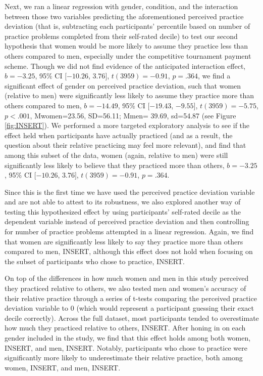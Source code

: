 \documentclass[a4paper, nobind]{templates/ociamthesis}
\begin{document}
Next, we ran a linear regression with gender, condition, and the interaction between those two variables predicting the aforementioned perceived practice deviation (that is, subtracting each participants' percentile based on number of practice problems completed from their self-rated decile) to test our second hypothesis that women would be more likely to assume they practice less than others compared to men, especially under the competitive tournament payment scheme. Though we did not find evidence of the anticipated interaction effect, \(b = -3.25\), 95\% CI \([-10.26\), \(3.76]\), \(t(3959) = -0.91\), \(p = .364\), we find a significant effect of gender on perceived practice deviation, such that women (relative to men) were significantly less likely to assume they practice more than others compared to men, \(b = -14.49\), 95\% CI \([-19.43\), \(-9.55]\), \(t(3959) = -5.75\), \(p < .001\), Mwomen=23.56, SD=56.11; Mmen= 39.69, sd=54.87 (see Figure \ref{fig:INSERT}). We performed a more targeted exploratory analysis to see if the effect held when participants have actually practiced (and as a result, the question about their relative practicing may feel more relevant), and find that among this subset of the data, women (again, relative to men) were still significantly less likely to believe that they practiced more than others, \(b = -3.25\), 95\% CI \([-10.26\), \(3.76]\), \(t(3959) = -0.91\), \(p = .364\).

Since this is the first time we have used the perceived practice deviation variable and are not able to attest to its robustness, we also explored another way of testing this hypothesized effect by using participants' self-rated decile as the dependent variable instead of perceived practice deviation and then controlling for number of practice problems attempted in a linear regression. Again, we find that women are significantly less likely to say they practice more than others compared to men, INSERT, although this effect does not hold when focusing on the subset of participants who chose to practice, INSERT.

On top of the differences in how much women and men in this study perceived they practiced relative to others, we also tested men and women's accuracy of their relative practice through a series of t-tests comparing the perceived practice deviation variable to 0 (which would represent a participant guessing their exact decile correctly). Across the full dataset, most participants tended to overestimate how much they practiced relative to others, INSERT. After honing in on each gender included in the study, we find that this effect holds among both women, INSERT, and men, INSERT. Notably, participants who chose to practice were significantly more likely to underestimate their relative practice, both among women, INSERT, and men, INSERT.
\end{document}
